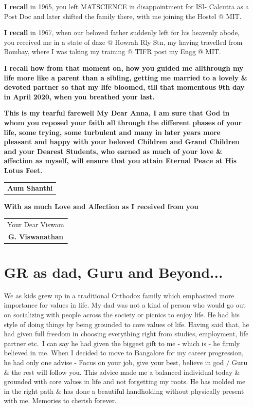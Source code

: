 \textbf{I recall} in 1965, you left MATSCIENCE in disappointment for ISI- Calcutta as a Post Doc and later shifted the family there, with me joining the Hostel @ MIT.

\textbf{I recall} in 1967, when our beloved father suddenly left for his heavenly abode, you received me in a state of daze @ Howrah Rly Stn, my having travelled from Bombay, where I was taking my training @ TIFR post my Engg @ MIT.

\textbf{I recall how from that moment on, how you guided me all\break through my life more like a parent than a sibling, getting me married to a lovely \& devoted partner so that my life bloomed, till that momentous 9th day in April 2020, when you breathed your last.}

\textbf{This is my tearful farewell My Dear Anna, I am sure that God in whom you reposed your faith all through the different phases of your life, some trying, some turbulent and many in later years more pleasant and happy with your beloved Children and Grand Children and your Dearest Students, who earned as much of your love \& affection as myself, will ensure that you attain Eternal Peace at His Lotus Feet. } 
\bigskip


\begin{flushright}
\begin{tabular}{c}
\textbf{Aum Shanthi}
\end{tabular}
\end{flushright}
\bigskip

\noindent 
\textbf{With as much Love and Affection as I received from you}
\bigskip

\begin{flushright}
\begin{tabular}{c}
Your Dear Viswam\\
\textbf{G. Viswanathan}
\end{tabular}
\end{flushright}
\bigskip

\section*{GR as dad, Guru and Beyond...}

We as kids grew up in a traditional Orthodox family which emphasized more importance for values in life. My dad was not a kind of person who would go out on socializing with people across the society or picnics to enjoy life. He had his style of doing things by being grounded to core values of life. Having said that, he had given full freedom in choosing everything right from studies, employment, life partner etc.\ I can say he had given the biggest gift to me - which is - he firmly believed in me. When I decided to move to Bangalore for my career progression, he had only one advise - Focus on your job, give your best, believe in god / Guru \& the rest will follow you. This advice made me a balanced individual today \& grounded with core values in life and not forgetting my roots. He has molded me in the right path \& has done a beautiful handholding without physically present with me. Memories to cherish forever.
\bigskip

